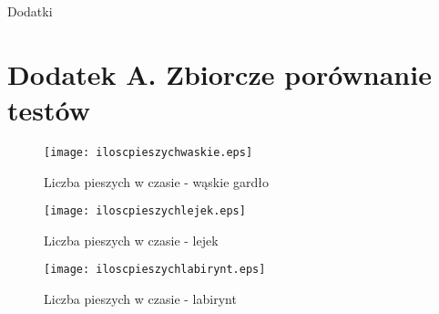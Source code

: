 \begin{titlepage}\centering
\vspace*{\fill}
\LARGE Dodatki
\vspace*{\fill}
\end{titlepage}

\chapter{Dodatek A. Zbiorcze porównanie testów}
\label{cha:dodatekA}

\begin{figure}
\label{figure:siatka}
\centering
\texttt{[image: iloscpieszychwaskie.eps]}
\caption{Liczba pieszych w czasie - wąskie gardło}
\end{figure}

\begin{figure}
\label{figure:siatka}
\centering
\texttt{[image: iloscpieszychlejek.eps]}
\caption{Liczba pieszych w czasie - lejek}
\end{figure}

\begin{figure}
\label{figure:siatka}
\centering
\texttt{[image: iloscpieszychlabirynt.eps]}
\caption{Liczba pieszych w czasie - labirynt}
\end{figure}
